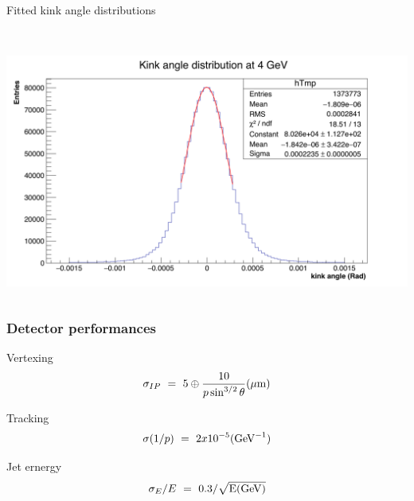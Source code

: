 \documentclass{beamer}
\begin{document}
\begin{frame}
\begin{block}{Fitted kink angle distributions}
\begin{columns}[c]
\begin{column}{5cm}
          \ 
          \includegraphics[width = \textwidth]{Pictures/kinkAngle4GeV.png}
        \end{column} 
      \end{columns}
    \end{block}
  \end{frame}



  \begin{frame}[plain]
    \frametitle{Detector performances}

    \begin{block}{Vertexing}
      \[ \sigma_{IP} \ = \ 5 \oplus \frac{10}{p\sin^{3/2}\theta} (\mu\rm{m})\]
    \end{block}

    \begin{block}{Tracking}
      \[ \sigma (1/p) \ = \ 2x10^{-5} (\rm{GeV}^{-1})\]
    \end{block}
      
    \begin{block}{Jet ernergy}
      \[\sigma_E / E \ = \ 0.3/\sqrt{\rm{E(GeV)}}\]
    \end{block}

  \end{frame}

\end{document}
